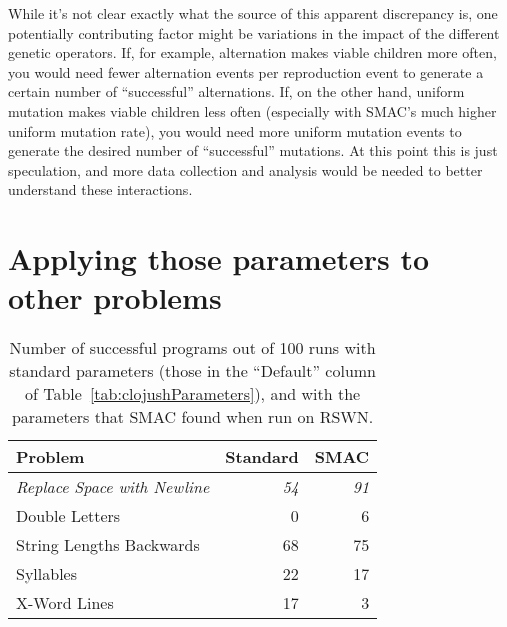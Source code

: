 While it's not clear exactly what the source of this apparent discrepancy is,
one potentially contributing factor might be variations in the impact of the
different genetic operators. If, for example, alternation makes viable 
children more often, you would need fewer alternation events 
per reproduction event to generate a certain number of ``successful''
alternations. If, on the other hand, uniform mutation makes viable children 
less often (especially with SMAC's much higher uniform mutation rate), 
you would need more uniform mutation events to generate the
desired number of ``successful'' mutations. At this point this is just
speculation, and more data collection and analysis would be needed to better
understand these interactions.

\section{Applying those parameters to other problems}
\label{sec:applyingToOtherProblems}

%
%

\begin{table}[t]
\centering
\caption{Number of successful programs out of 100 runs with standard parameters (those in the ``Default'' column of Table~\ref{tab:clojushParameters}), and with the parameters that SMAC found when run on RSWN.}
\label{table:results}
\begin{tabular}{l r r}
\toprule
\textbf{Problem} & \textbf{Standard} & \textbf{SMAC} \tabularnewline
\midrule
\textit{Replace Space with Newline} & \textit{54} & \textit{91} \tabularnewline
Double Letters	& 0 & 6 \tabularnewline
String Lengths Backwards & 68 & 75 \tabularnewline
Syllables & 22 & 17 \tabularnewline
X-Word Lines & 17 & 3 \tabularnewline
\bottomrule
\end{tabular}
\end{table}

